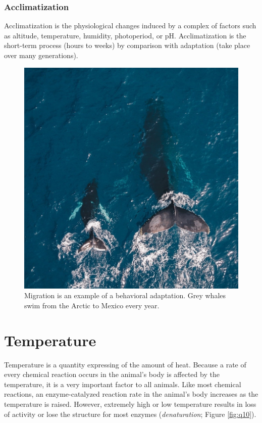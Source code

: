 \documentclass[]{book}
\begin{document}
\hypertarget{acclimatization}{%
\subsection{Acclimatization}\label{acclimatization}}

Acclimatization is the physiological changes induced by a complex of factors such as altitude, temperature, humidity, photoperiod, or pH. Acclimatization is the short-term process (hours to weeks) by comparison with adaptation (take place over many generations).

\begin{figure}

{\centering \includegraphics[width=1\linewidth]{figures/adaptation} 

}

\caption{Migration is an example of a behavioral adaptation. Grey whales swim from the Arctic to Mexico every year.}\label{fig:adaptation}
\end{figure}

\hypertarget{temperature}{%
\chapter{Temperature}\label{temperature}}

Temperature is a quantity expressing of the amount of heat. Because a rate of every chemical reaction occurs in the animal's body is affected by the temperature, it is a very important factor to all animals. Like most chemical reactions, an enzyme-catalyzed reaction rate in the animal's body increases as the temperature is raised. However, extremely high or low temperature results in loss of activity or lose the structure for most enzymes (\emph{denaturation}; Figure \ref{fig:q10}).
\end{document}
